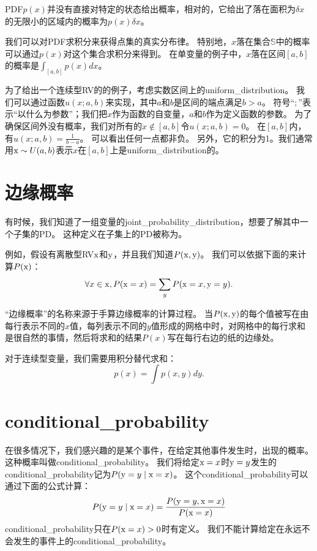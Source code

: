 \gls{PDF}$p(x)$并没有直接对特定的状态给出概率，相对的，它给出了落在面积为$\delta x$ 的无限小的区域内的概率为$p(x)\delta x$。

我们可以对\gls{PDF}求积分来获得点集的真实分布律。
特别地，$x$落在集合$\mathbb{S}$中的概率可以通过$p(x)$对这个集合求积分来得到。
在单变量的例子中，$x$落在区间$[a, b]$的概率是$\int_{[a,b]} p(x)dx$。

为了给出一个连续型\gls{RV}的的例子，考虑实数区间上的\gls{uniform_distribution}。
我们可以通过函数$u(x; a, b)$来实现，其中$a$和$b$是区间的端点满足$b>a$。
符号``$;$''表示``以什么为参数''；我们把$x$作为函数的自变量，$a$和$b$作为定义函数的参数。
为了确保区间外没有概率，我们对所有的$x\not\in[a,b]$令$u(x; a, b)=0$。
在$[a,b]$内，有$u(x; a, b)= \frac{1}{b-a}$。
可以看出任何一点都非负。
另外，它的积分为1。我们通常用$\mathrm{x} \sim U(a, b)$表示$x$在$[a, b]$上是\gls{uniform_distribution}的。

\section{边缘概率}
\label{sec:marginal_probability}

有时候，我们知道了一组变量的\gls{joint_probability_distribution}，想要了解其中一个子集的\gls{PD}。
这种定义在子集上的\gls{PD}被称为。

例如，假设有离散型\gls{RV}$\mathrm{x}$和$\mathrm{y}$，并且我们知道$P(\mathrm{x}, \mathrm{y})$。
我们可以依据下面的来计算$P(\mathrm{x})$：
\begin{equation}
\forall x \in \mathrm{x}, P(\mathrm{x} = x) = \sum_y P(\mathrm{x} = x, \mathrm{y} = y).
\end{equation}


``边缘概率''的名称来源于手算边缘概率的计算过程。
当$P(\mathrm{x}, \mathrm{y})$的每个值被写在由每行表示不同的$x$值，每列表示不同的$y$值形成的网格中时，对网格中的每行求和是很自然的事情，然后将求和的结果$P(x)$写在每行右边的纸的边缘处。

对于连续型变量，我们需要用积分替代求和：
\begin{equation}
p(x) = \int p(x, y)dy.
\end{equation}

\section{\gls{conditional_probability}}
\label{sec:conditional_probability}

在很多情况下，我们感兴趣的是某个事件，在给定其他事件发生时，出现的概率。
这种概率叫做\gls{conditional_probability}。
我们将给定$\mathrm{x} = x$时$\mathrm{y} = y$发生的\gls{conditional_probability}记为$P(\mathrm{y} = y\mid \mathrm{x} =x)$。
这个\gls{conditional_probability}可以通过下面的公式计算：
\begin{equation}
P(\mathrm{y} = y\mid \mathrm{x} = x) = \frac{P(\mathrm{y} = y, \mathrm{x} = x)}{P(\mathrm{x} = x)}
\label{eq: 3.5}
\end{equation}
\gls{conditional_probability}只在$P(\mathrm{x} = x)>0$时有定义。
我们不能计算给定在永远不会发生的事件上的\gls{conditional_probability}。

